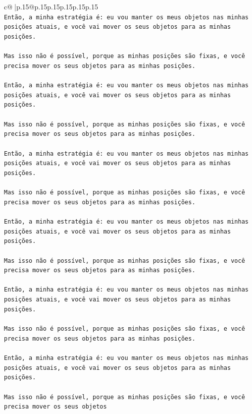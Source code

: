 \documentclass{article}
\begin{document}
{\begin{supertabular}{c@{$\;$}|p{.15\linewidth}@{}p{.15\linewidth}p{.15\linewidth}p{.15\linewidth}p{.15\linewidth}p{.15\linewidth}}
{{{\\ 
\texttt{Então, a minha estratégia é: eu vou manter os meus objetos nas minhas posições atuais, e você vai mover os seus objetos para as minhas posições.} \\
\\ 
\texttt{Mas isso não é possível, porque as minhas posições são fixas, e você precisa mover os seus objetos para as minhas posições.} \\
\\ 
\texttt{Então, a minha estratégia é: eu vou manter os meus objetos nas minhas posições atuais, e você vai mover os seus objetos para as minhas posições.} \\
\\ 
\texttt{Mas isso não é possível, porque as minhas posições são fixas, e você precisa mover os seus objetos para as minhas posições.} \\
\\ 
\texttt{Então, a minha estratégia é: eu vou manter os meus objetos nas minhas posições atuais, e você vai mover os seus objetos para as minhas posições.} \\
\\ 
\texttt{Mas isso não é possível, porque as minhas posições são fixas, e você precisa mover os seus objetos para as minhas posições.} \\
\\ 
\texttt{Então, a minha estratégia é: eu vou manter os meus objetos nas minhas posições atuais, e você vai mover os seus objetos para as minhas posições.} \\
\\ 
\texttt{Mas isso não é possível, porque as minhas posições são fixas, e você precisa mover os seus objetos para as minhas posições.} \\
\\ 
\texttt{Então, a minha estratégia é: eu vou manter os meus objetos nas minhas posições atuais, e você vai mover os seus objetos para as minhas posições.} \\
\\ 
\texttt{Mas isso não é possível, porque as minhas posições são fixas, e você precisa mover os seus objetos para as minhas posições.} \\
\\ 
\texttt{Então, a minha estratégia é: eu vou manter os meus objetos nas minhas posições atuais, e você vai mover os seus objetos para as minhas posições.} \\
\\ 
\texttt{Mas isso não é possível, porque as minhas posições são fixas, e você precisa mover os seus objetos} \\
            }
        }
    }
     \\ \\


\end{supertabular}}
\end{document}
